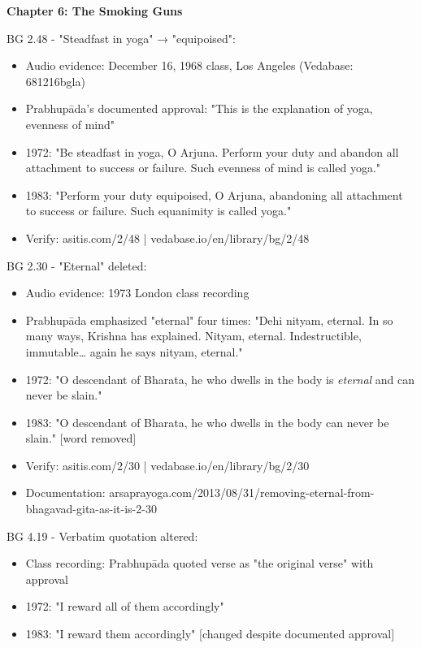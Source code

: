 \documentclass[12pt,twoside]{book}
\begin{document}
\vspace{0.5cm}

\textbf{\textbf{Chapter 6: The Smoking Guns}}

BG 2.48 - "Steadfast in yoga" → "equipoised":
\begin{itemize}
\item Audio evidence: December 16, 1968 class, Los Angeles (Vedabase: 681216bgla)
\item Prabhupāda's documented approval: "This is the explanation of yoga, evenness of mind"
\item 1972: "Be steadfast in yoga, O Arjuna. Perform your duty and abandon all attachment to success or failure. Such evenness of mind is called yoga."
\item 1983: "Perform your duty equipoised, O Arjuna, abandoning all attachment to success or failure. Such equanimity is called yoga."
\item Verify: asitis.com/2/48 | vedabase.io/en/library/bg/2/48
\end{itemize}

BG 2.30 - "Eternal" deleted:
\begin{itemize}
\item Audio evidence: 1973 London class recording
\item Prabhupāda emphasized "eternal" four times: "Dehi nityam, eternal. In so many ways, Krishna has explained. Nityam, eternal. Indestructible, immutable\ldots{} again he says nityam, eternal."
\item 1972: "O descendant of Bharata, he who dwells in the body is \emph{eternal} and can never be slain."
\item 1983: "O descendant of Bharata, he who dwells in the body can never be slain." [word removed]
\item Verify: asitis.com/2/30 | vedabase.io/en/library/bg/2/30
\item Documentation: arsaprayoga.com/2013/08/31/removing-eternal-from-bhagavad-gita-as-it-is-2-30
\end{itemize}

BG 4.19 - Verbatim quotation altered:
\begin{itemize}
\item Class recording: Prabhupāda quoted verse as "the original verse" with approval
\item 1972: "I reward all of them accordingly"
\item 1983: "I reward them accordingly" [changed despite documented approval]
\end{itemize}
\end{document}
